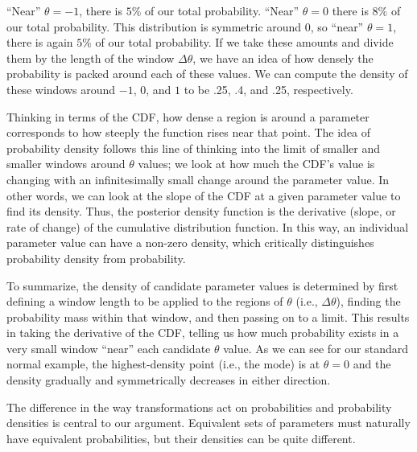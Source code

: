 \documentclass[9pt,twocolumn,twoside]{cidlab-draft}\templatetype{cidlab-invited}
\begin{document}
``Near'' $\theta=-1$, there is $5\%$ of our total probability. ``Near'' $\theta=0$ there is $8\%$ of our total probability. This distribution is symmetric around 0, so ``near'' $\theta=1$, there is again $5\%$ of our total probability. If we take these amounts and divide them by the length of the window $\Delta \theta$, we have an idea of how densely the probability is packed around each of these values. We can compute the density of these windows around  $-1$, 0, and $1$ to be .25, .4, and .25, respectively. 

Thinking in terms of the CDF, how dense a region is around a parameter corresponds to how steeply the function rises near that point. The idea of probability density follows this line of thinking into the limit of smaller and smaller windows around $\theta$ values; we look at how much the CDF's value is changing with an infinitesimally small change around the parameter value. In other words, we can look at the slope of the CDF at a given parameter value to find its density. Thus, the posterior density function is the derivative (slope, or rate of change) of the cumulative distribution function. In this way, an individual parameter value can have a non-zero density, which critically distinguishes probability density from probability.

To summarize, the density of candidate parameter values is determined by first defining a window length to be applied to the regions of $\theta$ (i.e., $\Delta\theta$), finding the probability mass within that window, and then passing on to a limit. This results in taking the derivative of the CDF, telling us how much probability exists in a very small window ``near'' each candidate $\theta$ value. As we can see for our standard normal example, the highest-density point (i.e., the mode) is at $\theta=0$ and the density gradually and symmetrically decreases in either direction.

The difference in the way transformations act on probabilities and probability densities is central to our argument. Equivalent sets of parameters must naturally have equivalent probabilities, but their densities can be quite different.
\end{document}
